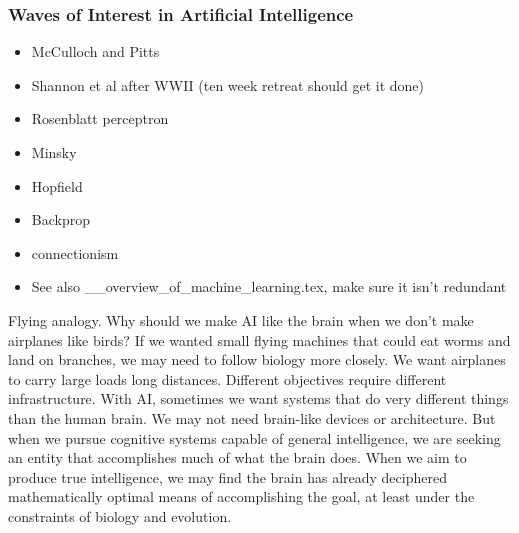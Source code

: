 \subsubsection{Waves of Interest in Artificial Intelligence}

\vspace{1em}
\begin{itemize}
\item McCulloch and Pitts
\item Shannon et al after WWII (ten week retreat should get it done)
\item Rosenblatt perceptron
\item Minsky
\item Hopfield
\item Backprop
\item connectionism
\item See also \_\_overview\_of\_machine\_learning.tex, make sure it isn't redundant
\end{itemize}

\vspace{3em}
\cite{jaha2004}


\vspace{1em}
Flying analogy. Why should we make AI like the brain when we don't make airplanes like birds? If we wanted small flying machines that could eat worms and land on branches, we may need to follow biology more closely. We want airplanes to carry large loads long distances. Different objectives require different infrastructure. With AI, sometimes we want systems that do very different things than the human brain. We may not need brain-like devices or architecture. But when we pursue cognitive systems capable of general intelligence, we are seeking an entity that accomplishes much of what the brain does. When we aim to produce true intelligence, we may find the brain has already deciphered mathematically optimal means of accomplishing the goal, at least under the constraints of biology and evolution.
